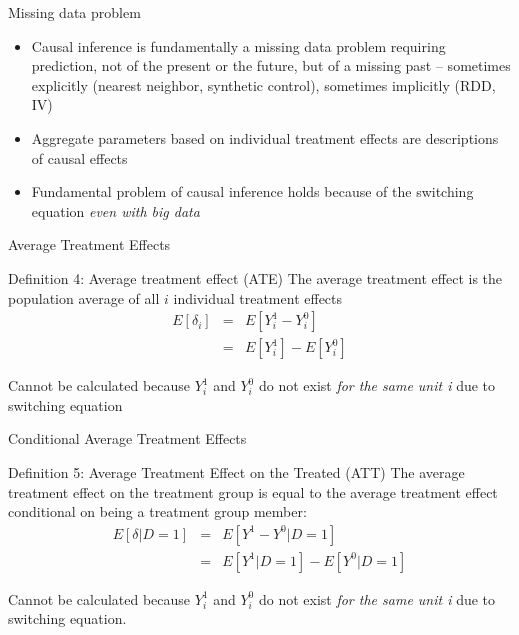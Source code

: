 \documentclass{beamer}
\begin{document}
\begin{frame}{Missing data problem}

  \begin{itemize}
    \item Causal inference is fundamentally a missing data problem requiring prediction, not of the present or the future, but of a missing past -- sometimes explicitly (nearest neighbor, synthetic control), sometimes implicitly (RDD, IV)
    \item Aggregate parameters based on individual treatment effects are descriptions of causal effects
    \item Fundamental problem of causal inference holds because of the switching equation \emph{even with big data}
  \end{itemize}

\end{frame}


\begin{frame}{Average Treatment Effects}

  \begin{block}{Definition 4: Average treatment effect (ATE)}
    The average treatment effect is the population average of all $i$ individual treatment effects
    \begin{eqnarray*}
      E[\delta_i]&=&E[Y_i^1-Y_i^0]\\
      &=&E[Y^1_i] - E[Y^0_i]
    \end{eqnarray*}
  \end{block}

  \bigskip

  Cannot be calculated because $Y^1_i$ and $Y^0_i$ do not exist \emph{for the same unit i} due to switching equation



\end{frame}



\begin{frame}{Conditional Average Treatment Effects}


  \begin{block}{Definition 5: Average Treatment Effect on the Treated (ATT)}
    The average treatment effect on the treatment group is equal to the average treatment effect conditional on being a treatment group member:
    \begin{eqnarray*}
      E[\delta|D=1]&=&E[Y^1-Y^0|D=1] \nonumber \\
      &=&E[Y^1|D=1]-E[Y^0|D=1]
    \end{eqnarray*}
  \end{block}
  Cannot be calculated because $Y^1_i$ and $Y^0_i$ do not exist \emph{for the same unit i} due to switching equation. 


\end{frame}
\end{document}
